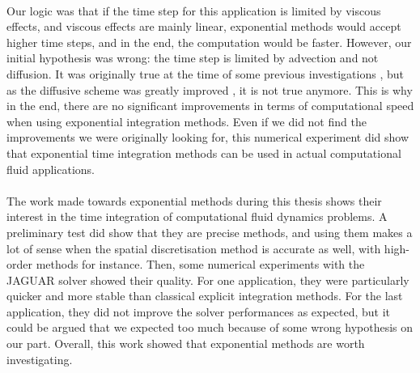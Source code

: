 
      \paragraph{}
      Our logic was that if the time step for this application is limited by viscous effects, and viscous effects are mainly linear, exponential methods would accept higher time steps, and in the end, the computation would be faster.
      However, our initial hypothesis was wrong: the time step is limited by advection and not diffusion.
      It was originally true at the time of some previous investigations \cite{BrunetCronerMinotEtAl2018}, but as the diffusive scheme was greatly improved , it is not true anymore.
      This is why in the end, there are no significant improvements in terms of computational speed when using exponential integration methods.
      Even if we did not find the improvements we were originally looking for, this numerical experiment did show that exponential time integration methods can be used in actual computational fluid applications.


  \paragraph{}
  The work made towards exponential methods during this thesis shows their interest in the time integration of computational fluid dynamics problems.
  A preliminary test did show that they are precise methods, and using them makes a lot of sense when the spatial discretisation method is accurate as well, with high-order methods for instance.
  Then, some numerical experiments with the JAGUAR solver showed their quality.
  For one application, they were particularly quicker and more stable than classical explicit integration methods.
  For the last application, they did not improve the solver performances as expected, but it could be argued that we expected too much because of some wrong hypothesis on our part.
  Overall, this work showed that exponential methods are worth investigating.
